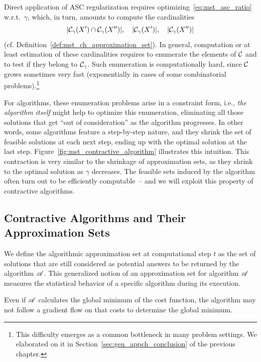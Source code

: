 Direct application of ASC regularization requires
optimizing~\eqref{eq:mst_asc_ratio} w.r.t.~$\gamma$, which, in turn, amounts
to compute the cardinalities 
\begin{equation}
  |{{\cal C}}_{\gamma}(X') \cap {{\cal C}}_{\gamma}(X'')|, 
  \quad |{{\cal C}}_{\gamma}(X')|, 
  \quad |{{\cal C}}_{\gamma}(X'')|
\end{equation}
(cf. Definition~\ref{def:mst_ch_approximation_set}).  In general, computation or
at least estimation of these cardinalities requires to enumerate the elements of
${\cal C}$ and to test if they belong to ${\cal C}_\gamma$. Such enumeration is
computationally hard, since ${\cal C}$ grows sometimes very fast (exponentially in
cases of some combinatorial problems).\footnote{This difficulty emerges as a
common bottleneck in many problem settings. We elaborated on it in
Section~\ref{sec:gen_appch_conclusion} of the previous chapter.}

For algorithms, these enumeration problems arise in a constraint form, i.e.,
\emph{the algorithm itself} might help to optimize this enumeration, eliminating
all those solutions that get ``out of consideration'' as the algorithm
progresses. In other words, some algorithms feature a step-by-step nature, and
they shrink the set of feasible solutions at each next step, ending up with the
optimal solution at the last step. Figure~\ref{fig:mst_contractive_algorithm}
illustrates this intuition. This contraction is very similar to the shrinkage of
approximation sets, as they shrink to the optimal solution as $\gamma$
decreases. The feasible sets induced by the algorithm often turn out to be
efficiently computable~-- and we will exploit this property of contractive
algorithms. 

\subsection{Contractive Algorithms and Their Approximation Sets}
We define the algorithmic approximation set at computational step $t$ as the set
of solutions that are still considered as potential answers to be returned by
the algorithm $\mathscr{A}$. This generalized notion of an approximation set for
algorithm $\mathscr{A}$ measures the statistical behavior of a specific algorithm
during its execution. 
%

\myremark Even if $\mathscr{A}$ calculates the global minimum of the cost
function, the algorithm may not follow a gradient flow on that costs to
determine the global minimum.


